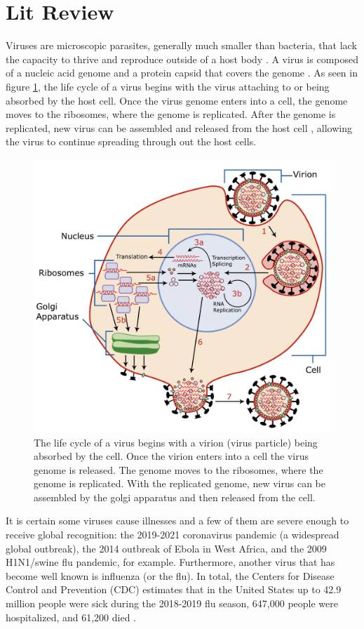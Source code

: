 \section{Lit Review}
Viruses are microscopic parasites, generally much smaller than bacteria, that lack the capacity to thrive and reproduce outside of a host body \cite{website2}. A virus is composed of a nucleic acid genome and a protein capsid that covers the genome \cite{website3}. As seen in figure \ref{fig:Virus_Replication}, the life cycle of a virus begins with the virus attaching to or being absorbed by the host cell. Once the virus genome enters into a cell, the genome moves to the ribosomes, where the genome is replicated. After the genome is replicated, new virus can be assembled and released from the host cell \cite{Kaiser}, allowing the virus to continue spreading through out the host cells.

\begin{figure}[h]
    \centering
    \includegraphics[width=0.6\linewidth]{Figures/Virus_Replication_large.pdf}
    \caption{The life cycle of a virus begins with a virion (virus particle) being absorbed by the cell. Once the virion enters into a cell the virus genome is released. The genome moves to the ribosomes, where the genome is replicated. With the replicated genome, new virus can be assembled by the golgi apparatus and then released from the cell.}
    \label{fig:Virus_Replication}
\end{figure}

It is certain some viruses cause illnesses and a few of them are severe enough to receive global recognition: the 2019-2021 coronavirus pandemic (a widespread global outbreak), the 2014 outbreak of Ebola in West Africa, and the 2009 H1N1/swine flu pandemic, for example. Furthermore, another virus that has become well known is influenza (or the flu). In total, the Centers for Disease Control and Prevention (CDC) estimates that in the United States up to 42.9 million people were sick during the 2018-2019 flu season, 647,000 people were hospitalized, and 61,200 died \cite{website4}.

